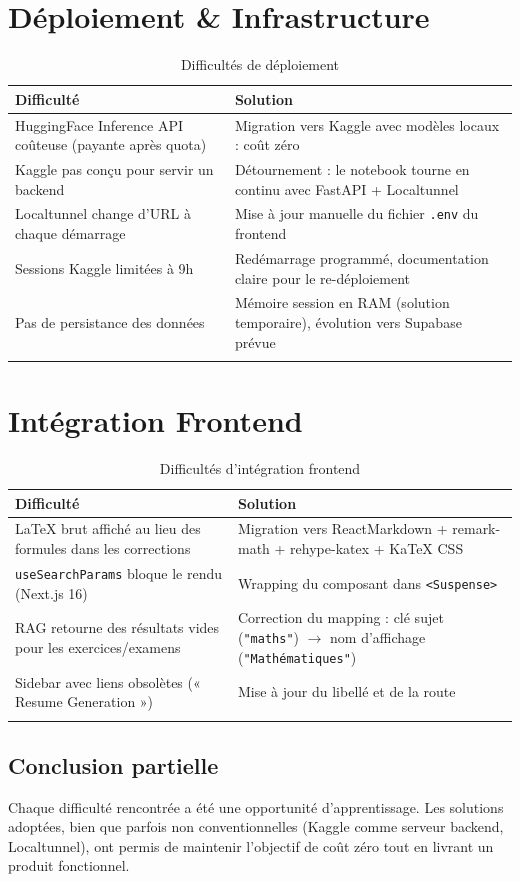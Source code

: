 \documentclass[12pt,a4paper]{report}
\begin{document}
\section{Déploiement \& Infrastructure}
\begin{longtable}{p{6.5cm} p{7.5cm}}
    \toprule
    \textbf{Difficulté} & \textbf{Solution} \\
    \midrule
    \endhead
    HuggingFace Inference API coûteuse (payante après quota) & Migration vers Kaggle avec modèles locaux : coût zéro \\
    Kaggle pas conçu pour servir un backend & Détournement : le notebook tourne en continu avec FastAPI + Localtunnel \\
    Localtunnel change d'URL à chaque démarrage & Mise à jour manuelle du fichier \texttt{.env} du frontend \\
    Sessions Kaggle limitées à 9h & Redémarrage programmé, documentation claire pour le re-déploiement \\
    Pas de persistance des données & Mémoire session en RAM (solution temporaire), évolution vers Supabase prévue \\
    \bottomrule
    \caption{Difficultés de déploiement}
\end{longtable}

\section{Intégration Frontend}
\begin{longtable}{p{6.5cm} p{7.5cm}}
    \toprule
    \textbf{Difficulté} & \textbf{Solution} \\
    \midrule
    \endhead
    LaTeX brut affiché au lieu des formules dans les corrections & Migration vers ReactMarkdown + remark-math + rehype-katex + KaTeX CSS \\
    \texttt{useSearchParams} bloque le rendu (Next.js 16) & Wrapping du composant dans \texttt{<Suspense>} \\
    RAG retourne des résultats vides pour les exercices/examens & Correction du mapping : clé sujet (\texttt{"maths"}) $\rightarrow$ nom d'affichage (\texttt{"Mathématiques"}) \\
    Sidebar avec liens obsolètes (« Resume Generation ») & Mise à jour du libellé et de la route \\
    \bottomrule
    \caption{Difficultés d'intégration frontend}
\end{longtable}

\subsection*{Conclusion partielle}
Chaque difficulté rencontrée a été une opportunité d'apprentissage. Les solutions adoptées, bien que parfois non conventionnelles (Kaggle comme serveur backend, Localtunnel), ont permis de maintenir l'objectif de coût zéro tout en livrant un produit fonctionnel.
\end{document}
